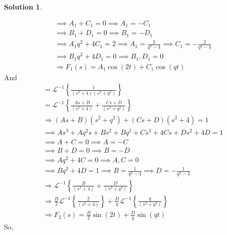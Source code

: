 \documentclass[10pt]{article}
\theoremstyle{definition}
\newtheorem{soln}{Solution}
\newcommand{\laplace}{\mathcal{L}}
\begin{document}
\begin{soln}
\begin{enumerate}[label=(\alph*)]
\begin{align*}
             & \implies A_1+C_1=0 \implies A_1=-C_1                                                                   \\
             & \implies B_1+D_1=0 \implies B_1=-D_1                                                                   \\
             & \implies A_1q^2+4C_1=2\implies A_1=\frac{2}{q^2-4}\implies C_1=-\frac{2}{q^2-4}                        \\
             & \implies B_1q^2+4D_1=0\implies B_1,D_1=0                                                               \\
             & \Rightarrow F_1(s)=A_1\cos\left(2t\right)+C_1\cos\left(qt\right)
          \end{align*}
          And
          \begin{align*}
             & = \laplace^{-1}\left\{\frac{1}{\left(s^2+4\right)\left(s^2+q^2\right)}\right\}                 \\
             & = \laplace^{-1}\left\{\frac{As+B}{\left(s^2+4\right)}+\frac{Cs+D}{\left(s^2+q^2\right)}\right\} \\
             & \Rightarrow \left(As+B\right)\left(s^2+q^2\right) + \left(Cs+D\right)\left(s^2+4\right)=1      \\
             & \implies As^3+Aq^2s+Bs^2+Bq^2+Cs^3+4Cs+Ds^2+4D=1                                               \\
             & \implies A+C=0 \implies A=-C                                                                   \\
             & \implies B+D=0 \implies B=-D                                                                   \\
             & \implies Aq^2+4C=0\implies A,C=0                                                               \\
             & \implies Bq^2+4D=1\implies B=\frac{1}{q^2-4}\implies D=-\frac{1}{q^2-4}\\
             & \Rightarrow \laplace^{-1}\left\{\frac{B}{\left(s^2+4\right)}+\frac{D}{\left(s^2+q^2\right)}\right\} \\
             & \Rightarrow \frac{B}{2}\laplace^{-1}\left\{\frac{2}{\left(s^2+4\right)}\right\}+\frac{D}{q}\laplace^{-1}\left\{\frac{q}{\left(s^2+q^2\right)}\right\} \\
             & \Rightarrow F_2(s)=\frac{B}{2}\sin\left(2t\right)+\frac{D}{q}\sin\left(qt\right)
          \end{align*}
          So,

\end{enumerate}
\end{soln}
\end{document}
